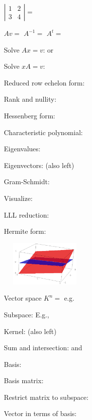 \documentclass[a4paper]{article}
\begin{document}
\begin{multicols*}{3}
$\left|\begin{matrix}1&2\\3&4\end{matrix}\right|=$

$Av=$  \quad $A^{-1}=$  \quad $A^t=$ 

Solve $Ax=v$:  or 

Solve $xA=v$: 

Reduced row echelon form: 

Rank and nullity: 

Hessenberg form: 

Characteristic polynomial: 

Eigenvalues: 

Eigenvectors:  (also left)

Gram-Schmidt: 

Visualize: 

LLL reduction: 

Hermite form: 


\includegraphics[width=12em,height=6em]{linalg.png}

Vector space $K^n = $  e.g. 

Subspace: \EX{)}
\BreakLineAndIndent
E.g., 

Kernel:  (also left)

Sum and intersection:  and 

Basis: 

Basis matrix: 

Restrict matrix to subspace: 

Vector in terms of basis: 



\end{multicols*}
\end{document}
